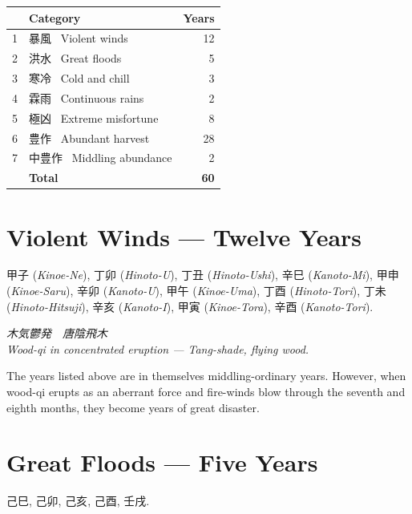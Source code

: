 \documentclass[10pt, openany]{book}
\newcommand{\jp}[1]{{\japanesefont #1}}
\begin{document}
\begin{center}
\begin{tabular}{@{}r l r@{}}
\toprule
 & \textbf{Category} & \textbf{Years}\\
\midrule
1 & \jp{暴風} \ Violent winds       & 12\\
2 & \jp{洪水} \ Great floods        &  5\\
3 & \jp{寒冷} \ Cold and chill      &  3\\
4 & \jp{霖雨} \ Continuous rains    &  2\\
5 & \jp{極凶} \ Extreme misfortune  &  8\\
6 & \jp{豊作} \ Abundant harvest    & 28\\
7 & \jp{中豊作} \ Middling abundance &  2\\
\midrule
  & \textbf{Total}                  & \textbf{60}\\
\bottomrule
\end{tabular}
\end{center}

\section{Violent Winds --- Twelve Years}

\jp{甲子} (\textit{Kinoe-Ne}), \jp{丁卯} (\textit{Hinoto-U}),
\jp{丁丑} (\textit{Hinoto-Ushi}), \jp{辛巳} (\textit{Kanoto-Mi}),
\jp{甲申} (\textit{Kinoe-Saru}), \jp{辛卯} (\textit{Kanoto-U}),
\jp{甲午} (\textit{Kinoe-Uma}), \jp{丁酉} (\textit{Hinoto-Tori}),
\jp{丁未} (\textit{Hinoto-Hitsuji}), \jp{辛亥} (\textit{Kanoto-I}),
\jp{甲寅} (\textit{Kinoe-Tora}), \jp{辛酉} (\textit{Kanoto-Tori}).

\begin{center}
\textit{\jp{木気鬱発　唐陰飛木}}\\[0.2em]
\textit{Wood-qi in concentrated eruption --- Tang-shade, flying
wood.}
\end{center}

The years listed above are in themselves middling-ordinary years.
However, when wood-qi erupts as an aberrant force and fire-winds
blow through the seventh and eighth months, they become years of
great disaster.

\section{Great Floods --- Five Years}

\jp{己巳}, \jp{己卯}, \jp{己亥}, \jp{己酉}, \jp{壬戌}.
\end{document}
